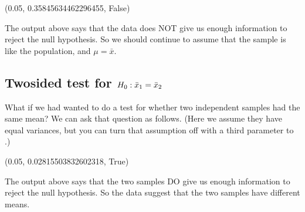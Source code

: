 \documentclass[letterpaper,10pt,english]{sphinxmanual}
\begin{document}
\begin{sphinxVerbatim}[commandchars=\\\{\}]
(0.05, 0.35845634462296455, False)
\end{sphinxVerbatim}

The output above says that the data does NOT give us enough information to reject the null hypothesis.  So we should continue to assume that the sample is like the population, and \(\mu=\bar{x}\).


\subsection{Two\sphinxhyphen{}sided test for \protect\(H_0: \bar{x}_1=\bar{x}_2\protect\)}
\label{\detokenize{GB213-review-in-Python:two-sided-test-for-h-0-bar-x-1-bar-x-2}}
What if we had wanted to do a test for whether two independent samples had the same mean?  We can ask that question as follows.  (Here we assume they have equal variances, but you can turn that assumption off with a third parameter to .)

\begin{sphinxVerbatim}[commandchars=\\\{\}]
  
  \PYG{p}{[}       \PYG{p}{]}
  \PYG{p}{[}      \PYG{p}{]}
      
    
  
\end{sphinxVerbatim}

\begin{sphinxVerbatim}[commandchars=\\\{\}]
(0.05, 0.02815503832602318, True)
\end{sphinxVerbatim}

The output above says that the two samples DO give us enough information to reject the null hypothesis.  So the data suggest that the two samples have different means.
\end{document}
